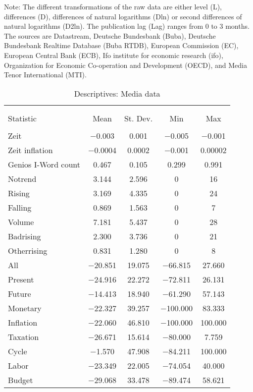\documentclass[10pt]{article}
\begin{document}
{\tiny{}
Note: The different transformations of the raw data are either level (L), differences (D), differences of natural logarithms (Dln) or second differences of natural logarithms (D2ln). The publication lag (Lag) ranges from 0 to 3 months. The sources are Datastream, Deutsche Bundesbank (Buba), Deutsche Bundesbank Realtime Database (Buba RTDB), European Commission (EC), European Central Bank (ECB), Ifo institute for economic research (ifo), 
Organization for Economic Co-operation and Development (OECD), and Media Tenor International (MTI).
}


\begin{table}[!htbp]
\caption{Descriptives: Media data}


\centering{}\label{} %
\begin{tabular}{@{\extracolsep{5pt}}lcccc}
 &  &  &  & \tabularnewline
 &  &  &  & \tabularnewline
\hline 
Statistic  & \multicolumn{1}{c}{Mean} & \multicolumn{1}{c}{St. Dev.} & \multicolumn{1}{c}{Min} & \multicolumn{1}{c}{Max}\tabularnewline
 &  &  &  & \tabularnewline
Zeit  & $-$0.003  & 0.001  & $-$0.005  & $-$0.001 \tabularnewline
Zeit inflation   & $-$0.0004  & 0.0002  & $-$0.001  & 0.00002 \tabularnewline
Genios I-Word count  & 0.467  & 0.105  & 0.299  & 0.991 \tabularnewline
Notrend  & 3.144  & 2.596  & 0  & 16 \tabularnewline
Rising  & 3.169  & 4.335  & 0  & 24 \tabularnewline
Falling  & 0.869  & 1.563  & 0  & 7 \tabularnewline
Volume  & 7.181  & 5.437  & 0  & 28 \tabularnewline
Badrising  & 2.300  & 3.736  & 0  & 21 \tabularnewline
Otherrising  & 0.831  & 1.280  & 0  & 8 \tabularnewline
All  & $-$20.851  & 19.075  & $-$66.815  & 27.660 \tabularnewline
Present  & $-$24.916  & 22.272  & $-$72.811  & 26.131 \tabularnewline
Future  & $-$14.413  & 18.940  & $-$61.290  & 57.143 \tabularnewline
Monetary  & $-$22.327  & 39.257  & $-$100.000  & 83.333 \tabularnewline
Inflation  & $-$22.060  & 46.810  & $-$100.000  & 100.000 \tabularnewline
Taxation  & $-$26.671  & 15.614  & $-$80.000  & 7.759 \tabularnewline
Cycle  & $-$1.570  & 47.908  & $-$84.211  & 100.000 \tabularnewline
Labor  & $-$23.349  & 22.005  & $-$74.054  & 40.000 \tabularnewline
Budget  & $-$29.068  & 33.478  & $-$89.474  & 58.621 \tabularnewline
\hline 
\end{tabular}
\end{table}
\end{document}
